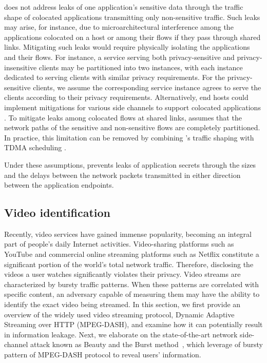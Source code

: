 {\sys} does not address leaks of one application's sensitive data through the traffic shape of colocated applications transmitting only non-sensitive traffic.
Such leaks may arise, for instance, due to microarchitectural interference among the applications colocated on a host or among their flows if they pass through shared links.
Mitigating such leaks would require physically isolating the
applications and their flows.
For instance, a service serving both privacy-sensitive and privacy-insensitive clients may be partitioned into two instances, with each instance dedicated to serving clients with similar privacy requirements.
For the privacy-sensitive clients, we assume the corresponding service instance agrees to serve the clients according to their privacy requirements. 
Alternatively, end hosts could implement mitigations for various side channels to support colocated applications \cite{mehta2022pacer, page05partitionedcache, shi2011limiting, kim2012stealthmem, varadarajan2014scheduler, braun2015robust}. 
To mitigate leaks among colocated flows at shared links, {\sys} assumes that the network paths of the sensitive and non-sensitive flows are completely partitioned.
In practice, this limitation can be removed by combining {\sys}’s traffic shaping with TDMA scheduling \cite{beams2021ifs, vattikonda2012tdma}.


Under these assumptions, {\sys} prevents leaks of application secrets through the sizes and the delays between the network packets transmitted in either direction between the application endpoints.



\subsection{Video identification}\label{subsec:video-classification}

Recently, video services have gained immense popularity, becoming an integral part of people's daily Internet activities.
Video-sharing platforms such as YouTube and commercial online streaming platforms such as Netflix constitute a significant portion of the world's total network traffic. 
Therefore, disclosing the videos a user watches significantly violates their privacy.
Video streams are characterized by bursty traffic patterns.
When these patterns are correlated with specific content, an adversary capable of measuring them may have the ability to identify the exact video being streamed.
In this section, we first provide an overview of the widely used video streaming protocol, Dynamic Adaptive Streaming over HTTP (MPEG-DASH), and examine how it can potentially result in information leakage. 
Next, we elaborate on the state-of-the-art network side-channel attack known as Beauty and the Burst method~\cite{schuster2017beautyburst}, which leverage of bursty pattern of MPEG-DASH protocol to reveal users' information. 

